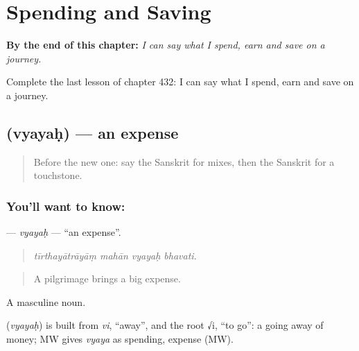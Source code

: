 
\chapter{Spending and Saving}
\label{ch:sa-spending-and-saving}

\begin{chapteropening}
\textbf{By the end of this chapter:} \emph{I can say what I spend, earn and save on a journey.}

Complete the last lesson of chapter 432: I can say what I spend, earn and save on a journey.
\end{chapteropening}

\section[\texorpdfstring{\sk{व्ययः} (vyayaḥ)}{व्ययः (vyayaḥ)}]{ (vyayaḥ) — an expense}

\label{lesson:SA-C432-vyayah}



\begin{quote}
Before the new one: say the Sanskrit for mixes, then the Sanskrit for a touchstone.
\end{quote}

\subsection*{You'll want to know: }
\textbf{} — \emph{vyayaḥ} — \textquotedblleft{}an expense\textquotedblright{}.

\begin{quote}
   
\end{quote}

\begin{quote}
\emph{tīrthayātrāyāṃ mahān vyayaḥ bhavati.}
\end{quote}

\begin{quote}
A pilgrimage brings a big expense.
\end{quote}

A masculine noun.

\begin{cousinweb}
\textbf{} (\emph{vyayaḥ}) is built from \emph{vi}, \textquotedblleft{}away\textquotedblright{}, and the root √i, \textquotedblleft{}to go\textquotedblright{}: a going away of money; MW gives \emph{vyaya} as spending, expense (MW).
\end{cousinweb}

